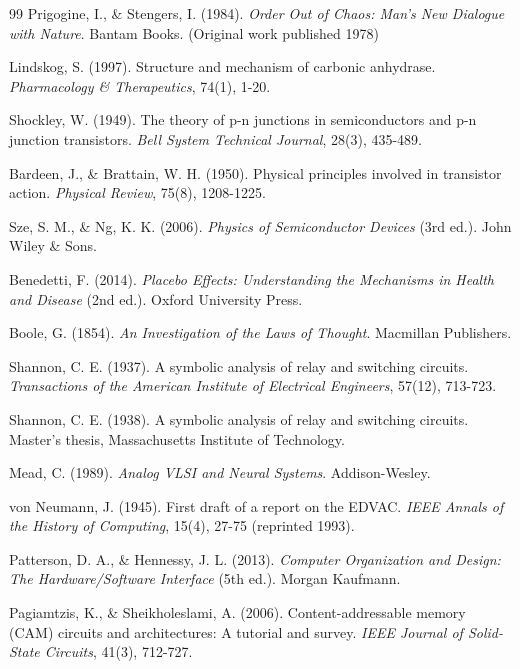\documentclass[11pt,a4paper]{article}
\begin{document}
\begin{thebibliography}{99}
Prigogine, I., \& Stengers, I. (1984). \textit{Order Out of Chaos: Man's New Dialogue with Nature}. Bantam Books. (Original work published 1978)

Lindskog, S. (1997). Structure and mechanism of carbonic anhydrase. \textit{Pharmacology \& Therapeutics}, 74(1), 1-20.

Shockley, W. (1949). The theory of p-n junctions in semiconductors and p-n junction transistors. \textit{Bell System Technical Journal}, 28(3), 435-489.

Bardeen, J., \& Brattain, W. H. (1950). Physical principles involved in transistor action. \textit{Physical Review}, 75(8), 1208-1225.

Sze, S. M., \& Ng, K. K. (2006). \textit{Physics of Semiconductor Devices} (3rd ed.). John Wiley \& Sons.

Benedetti, F. (2014). \textit{Placebo Effects: Understanding the Mechanisms in Health and Disease} (2nd ed.). Oxford University Press.

Boole, G. (1854). \textit{An Investigation of the Laws of Thought}. Macmillan Publishers.

Shannon, C. E. (1937). A symbolic analysis of relay and switching circuits. \textit{Transactions of the American Institute of Electrical Engineers}, 57(12), 713-723.

Shannon, C. E. (1938). A symbolic analysis of relay and switching circuits. Master's thesis, Massachusetts Institute of Technology.

Mead, C. (1989). \textit{Analog VLSI and Neural Systems}. Addison-Wesley.

von Neumann, J. (1945). First draft of a report on the EDVAC. \textit{IEEE Annals of the History of Computing}, 15(4), 27-75 (reprinted 1993).

Patterson, D. A., \& Hennessy, J. L. (2013). \textit{Computer Organization and Design: The Hardware/Software Interface} (5th ed.). Morgan Kaufmann.

Pagiamtzis, K., \& Sheikholeslami, A. (2006). Content-addressable memory (CAM) circuits and architectures: A tutorial and survey. \textit{IEEE Journal of Solid-State Circuits}, 41(3), 712-727.


\end{thebibliography}
\end{document}
